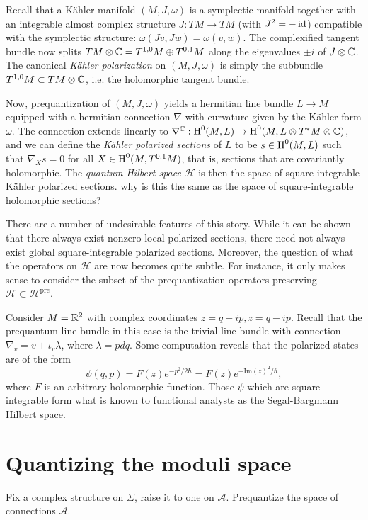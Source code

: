 \documentclass{amsart}
\begin{document}
Recall that a K\"ahler manifold $(M,J,\omega)$ is a symplectic manifold together
with an integrable almost complex structure $J:TM\to TM$ (with $J^2=-\operatorname{id}$) compatible with
the symplectic structure: $\omega(Jv,Jw)=\omega(v,w)$.
The complexified tangent bundle
now splits $TM\otimes\mathbb{C}=T^{1,0}M\oplus T^{0,1}M$ along the eigenvalues $\pm i$ of $J\otimes\mathbb{C}$.
The canonical \textit{K\"ahler polarization} on $(M,J,\omega)$ is simply the subbundle
$T^{1,0}M\subset TM\otimes\mathbb{C}$, i.e. the holomorphic tangent bundle.

Now, prequantization of $(M,J,\omega)$ yields a hermitian line bundle $L\to M$ equipped
with a hermitian connection $\nabla$ with curvature given by the K\"ahler form $\omega$.
The connection extends linearly to $\nabla^{\mathbb{C}}:\operatorname{H}^0(M,L)\to\operatorname{H}^0(M,L\otimes T^*M\otimes\mathbb{C})$,
and we can define the \textit{K\"ahler polarized sections} of $L$ to be $s\in\operatorname{H}^0(M,L)$ such that
$\nabla_Xs=0$ for all $X\in\operatorname{H}^0(M,T^{0,1}M)$, that is, sections that are covariantly holomorphic.
The \textit{quantum Hilbert space} $\mathcal{H}$ is then the space of square-integrable K\"ahler
polarized sections. {\color{red} why is this the same as the space of square-integrable holomorphic sections?}

There are a number of undesirable features of this story.
While it can be shown that there always exist nonzero local polarized sections, there need not always exist
global square-integrable polarized sections.  Moreover, the question of what the operators on $\mathcal{H}$
are now becomes quite subtle.
For instance, it only makes sense to consider the subset of the prequantization operators
preserving $\mathcal{H}\subset\mathcal{H}^\text{pre}$.

\begin{example}
    Consider $M=\mathbb{R}^2$ with complex coordinates $z=q+ip, \bar z=q-ip$. Recall that the
    prequantum line bundle in this case is the trivial line bundle with connection $\nabla_v = v+\iota_v\lambda$,
    where $\lambda=pdq$. Some computation reveals that the polarized states are of the form
    \begin{equation*}
        \psi(q,p) = F(z)e^{-p^2/2\hbar} = F(z)e^{-\text{Im}(z)^2/\hbar},
    \end{equation*}
    where $F$ is an arbitrary holomorphic function. Those $\psi$ which are square-integrable
    form what is known to functional analysts as the Segal-Bargmann Hilbert space.
\end{example}

\section{Quantizing the moduli space}

Fix a complex structure on $\Sigma$, raise it to one on $\mathscr{A}$. Prequantize the
space of connections $\mathscr{A}$.

\nocite{*}
\printbibliography
\end{document}
